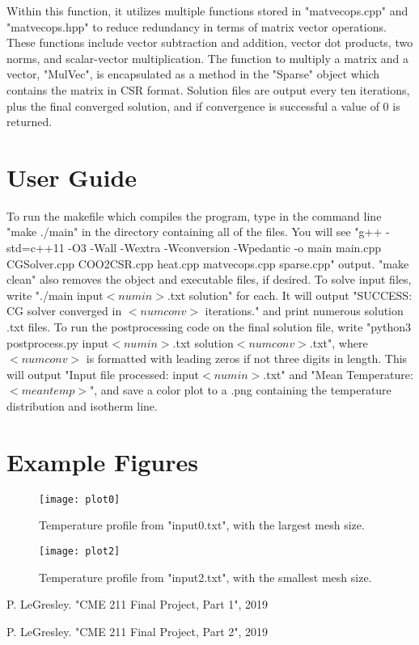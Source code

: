 \documentclass{article}
\begin{document}
\vspace{2ex}
	Within this function, it utilizes multiple functions stored in "matvecops.cpp" and "matvecops.hpp" to reduce redundancy in terms of matrix vector operations. These functions include vector subtraction and addition, vector dot products, two norms, and scalar-vector multiplication. The function to multiply a matrix and a vector, "MulVec", is encapsulated as a method in the "Sparse" object which contains the matrix in CSR format. Solution files are output every ten iterations, plus the final converged solution, and if convergence is successful a value of 0 is returned.

\section{User Guide}

To run the makefile which compiles the program, type in the command line "make ./main" in the directory containing all of the files. You will see "g++ -std=c++11 -O3 -Wall -Wextra -Wconversion -Wpedantic -o main main.cpp CGSolver.cpp COO2CSR.cpp heat.cpp matvecops.cpp sparse.cpp" output. "make clean" also removes the object and executable files, if desired. To solve input files, write "./main input$<num in>$.txt solution" for each. It will output "SUCCESS: CG solver converged in $<num conv>$ iterations." and print numerous solution .txt files. To run the postprocessing code on the final solution file, write "python3 postprocess.py input$<num in>$.txt solution$<num conv>$.txt", where $<num conv>$ is formatted with leading zeros if not three digits in length. This will output "Input file processed: input$<num in>$.txt" and "Mean Temperature: $<mean temp>$", and save a color plot to a .png containing the temperature distribution and isotherm line.

\section{Example Figures}

\begin{figure}[ht!] %
    \centering
    \texttt{[image: plot0]}
    \caption{Temperature profile from "input0.txt", with the largest mesh size.}
    \label{Input0}
\end{figure}

\begin{figure}[ht!] %
    \centering
    \texttt{[image: plot2]}
    \caption{Temperature profile from "input2.txt", with the smallest mesh size.}
    \label{Input2}
\end{figure}

\begin{thebibliography}{99}

P. LeGresley. "CME 211 Final Project, Part 1", 2019

P. LeGresley. "CME 211 Final Project, Part 2", 2019

\end{thebibliography}

	
\end{document}
